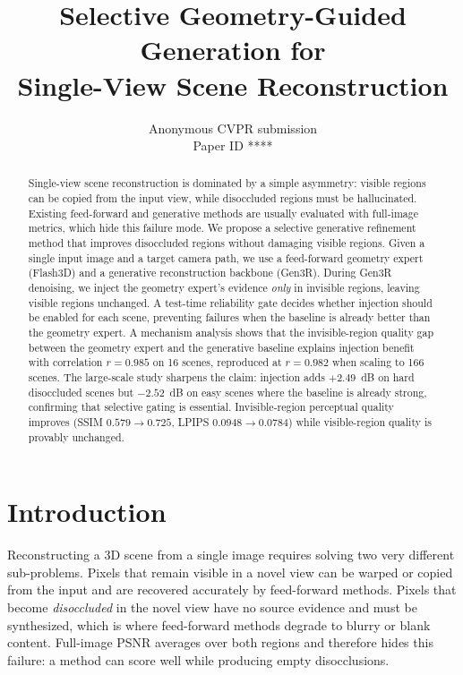 \documentclass[10pt,twocolumn,letterpaper]{article}
\title{Selective Geometry-Guided Generation for\\ Single-View Scene Reconstruction}
\author{Anonymous CVPR submission\\\small Paper ID ****}
\date{}
\begin{document}
\maketitle

\begin{abstract}
Single-view scene reconstruction is dominated by a simple asymmetry: visible
regions can be copied from the input view, while disoccluded regions must be
hallucinated. Existing feed-forward and generative methods are usually evaluated
with full-image metrics, which hide this failure mode. We propose a selective
generative refinement method that improves disoccluded regions without damaging
visible regions. Given a single input image and a target camera path, we use a
feed-forward geometry expert (Flash3D) and a generative reconstruction backbone
(Gen3R). During Gen3R denoising, we inject the geometry expert's evidence
\emph{only} in invisible regions, leaving visible regions unchanged. A test-time
reliability gate decides whether injection should be enabled for each scene,
preventing failures when the baseline is already better than the geometry
expert. A mechanism analysis shows that the invisible-region quality gap between
the geometry expert and the generative baseline explains injection benefit with
correlation $r=0.985$ on 16 scenes, reproduced at $r=0.982$ when scaling to 166
scenes. The large-scale study sharpens the claim: injection adds $+2.49$~dB on
hard disoccluded scenes but $-2.52$~dB on easy scenes where the baseline is
already strong, confirming that selective gating is essential. Invisible-region
perceptual quality improves (SSIM $0.579\!\to\!0.725$, LPIPS
$0.0948\!\to\!0.0784$) while visible-region quality is provably unchanged.
\end{abstract}

\section{Introduction}
\label{sec:intro}

Reconstructing a 3D scene from a single image requires solving two very
different sub-problems. Pixels that remain visible in a novel view can be warped
or copied from the input and are recovered accurately by feed-forward methods.
Pixels that become \emph{disoccluded} in the novel view have no source evidence
and must be synthesized, which is where feed-forward methods degrade to blurry
or blank content. Full-image PSNR averages over both regions and therefore hides
this failure: a method can score well while producing empty disocclusions.
\end{document}
